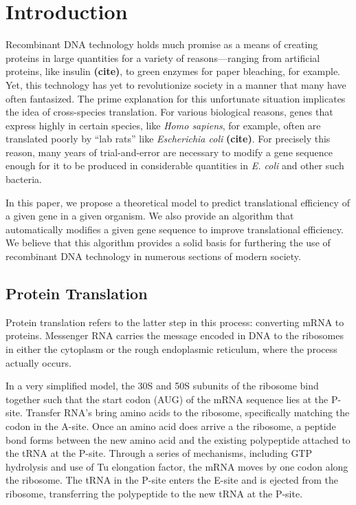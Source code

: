 \documentclass[12pt,titlepage]{article}
\providecommand{\hj}{\textbf{(cite)}}
\numberwithin{equation}{section}
\begin{document}
\section{Introduction}
\label{sec:intro}

Recombinant DNA technology holds much promise as a means of creating proteins in large quantities for a variety of reasons---ranging from artificial proteins, like insulin \hj, to green enzymes for paper bleaching, for example. Yet, this technology has yet to revolutionize society in a manner that many have often fantasized.  The prime explanation for this unfortunate situation implicates the idea of cross-species translation.  For various biological reasons, genes that express highly in certain species, like \emph{Homo sapiens}, for example, often are translated poorly by ``lab rats'' like \emph{Escherichia coli} \hj.  For precisely this reason, many years of trial-and-error are necessary to modify a gene sequence enough for it to be produced in considerable quantities in \emph{E. coli} and other such bacteria.

In this paper, we propose a theoretical model to predict translational efficiency of a given gene in a given organism.  We also provide an algorithm that automatically modifies a given gene sequence to improve translational efficiency.  We believe that this algorithm provides a solid basis for furthering the use of recombinant DNA technology in numerous sections of modern society.

\subsection{Protein Translation}
\label{sec:translation}

Protein translation refers to the latter step in this process: converting mRNA to proteins.  Messenger RNA carries the message encoded in DNA to the ribosomes in either the cytoplasm or the rough endoplasmic reticulum, where the process actually occurs.

In a very simplified model, the 30S and 50S subunits of the ribosome bind together such that the start codon (AUG) of the mRNA sequence lies at the P-site.  Transfer RNA's bring amino acids to the ribosome, specifically matching the codon in the A-site.  Once an amino acid does arrive a the ribosome, a peptide bond forms between the new amino acid and the existing polypeptide attached to the tRNA at the P-site.  Through a series of mechanisms, including GTP hydrolysis and use of Tu elongation factor, the mRNA moves by one codon along the ribosome.  The tRNA in the P-site enters the E-site and is ejected from the ribosome, transferring the polypeptide to the new tRNA at the P-site.
\end{document}
